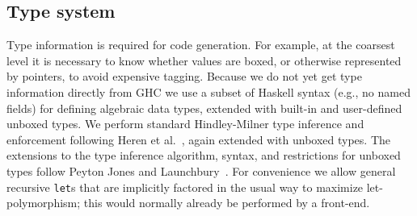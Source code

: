\documentclass{llncs}
\begin{document}
\begin{comment}
For \emph{direct calls}, in which a known function is applied
to a number of arguments equal to its arity, \emph{stgApply} need not be
invoked: the \emph{FUN} is tail-called directly.


In addition to being in a tail call position, the GCC constraints for
generating a tail call (jump) are (approximately) that the total size of the
caller and callee arguments be equal, and the return type sizes be equal.  For
Clang the requirement is slightly more strict: caller and callee type
signatures must be the same.  These are a consequence of the C calling
convention that the caller, not callee, cleans up the stack (removes the
callee's stack frame).  However, because we maintain our own stack we can
define our own calling convention(s), so tail calls can be made to functions
of notionally differing type.  In particular, top-of-stack frames can be
adjusted in size and content without undue copying.
\end{comment}

\subsection{Type system}

Type information is required for code generation.  For example, at the
coarsest level it is necessary to know whether values are boxed, or otherwise
represented by pointers, to avoid expensive tagging.  Because we
do not yet get type information directly from GHC we use a subset of Haskell
syntax (e.g., no named fields) for defining algebraic data types, extended
with built-in and user-defined unboxed types.  We perform standard
Hindley-Milner type inference and enforcement following Heren et
al.~\cite{Heren02}, again extended with unboxed types.  The extensions to the
type inference algorithm, syntax, and restrictions for unboxed types follow
Peyton Jones and Launchbury~\cite{Jones:1991}.
For convenience we allow general recursive \texttt{let}s that are implicitly
factored in the usual way to maximize let-polymorphism; this would normally
already be performed by a front-end.
\begin{comment}
 breaks the page limit
One would expect an automated STG generator such as GHC to factor recursive
\texttt{let} expressions into nested recursive and non-recursive \texttt{let}s
in the usual way to maximize let-polymorphism.  Because our STG is intended
to be somewhat convenient to write by hand we relax this constraint and perform
this transformation implicitly using a strongly-connected components algorithm
inspired by King and Launchbury~\cite{King:1995}.
\end{comment}
\end{document}
